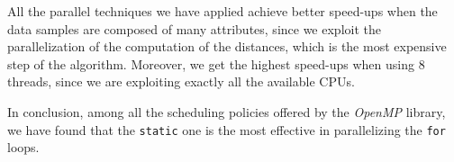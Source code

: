\documentclass{article}
\begin{document}

All the parallel techniques we have applied achieve better speed-ups when the data samples are
composed of many attributes, since we exploit the parallelization of the computation of
the distances, which is the most expensive step of the algorithm.
Moreover, we get the highest speed-ups when using 8 threads, since we are exploiting exactly all the
available CPUs.

In conclusion, among all the scheduling policies offered by the \textit{OpenMP} library, we have
found that the \texttt{static} one is the most effective in parallelizing the \texttt{for} loops.
\vspace{-12pt}



\newlength{\graphShift}
\newlength{\axesLineWidth}
\newlength{\gridLineWidth}
\newlength{\graphLineWidth}
\setlength{\graphShift}{0mm}
\setlength{\axesLineWidth}{2pt}
\setlength{\gridLineWidth}{1pt}
\setlength{\graphLineWidth}{2pt}



\end{document}
